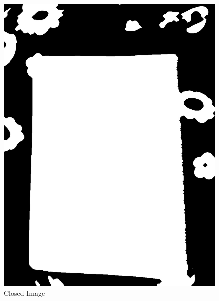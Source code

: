 \begin{enumerate}
\begin{figure}[h]
    \end{figure}
    \begin{figure}[h]
        \centering
        \begin{minipage}[b]{0.30\linewidth}
            \includegraphics[width=\linewidth]{output/closed.jpg}
            \caption{Closed Image}
        \end{minipage}
        \hspace{3cm}
        \begin{minipage}[b]{0.30\linewidth}

\end{minipage}
\end{figure}
\end{enumerate}
